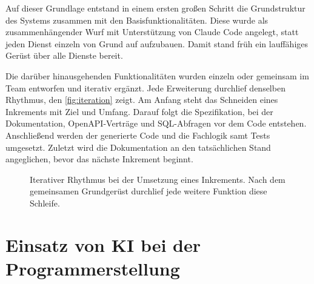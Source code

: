 Auf dieser Grundlage entstand in einem ersten großen Schritt die Grundstruktur des Systems zusammen mit den Basisfunktionalitäten. Diese wurde als zusammenhängender Wurf mit Unterstützung von Claude Code angelegt, statt jeden Dienst einzeln von Grund auf aufzubauen. Damit stand früh ein lauffähiges Gerüst über alle Dienste bereit.

Die darüber hinausgehenden Funktionalitäten wurden einzeln oder gemeinsam im Team entworfen und iterativ ergänzt. Jede Erweiterung durchlief denselben Rhythmus, den \vref{fig:iteration} zeigt. Am Anfang steht das Schneiden eines Inkrements mit Ziel und Umfang. Darauf folgt die Spezifikation, bei der Dokumentation, OpenAPI-Verträge und SQL-Abfragen vor dem Code entstehen. Anschließend werden der generierte Code und die Fachlogik samt Tests umgesetzt. Zuletzt wird die Dokumentation an den tatsächlichen Stand angeglichen, bevor das nächste Inkrement beginnt.

\begin{figure}[ht]
  \centering
  \caption{Iterativer Rhythmus bei der Umsetzung eines Inkrements. Nach dem gemeinsamen Grundgerüst durchlief jede weitere Funktion diese Schleife.}
  \label{fig:iteration}
\end{figure}

\section{Einsatz von KI bei der Programmerstellung}
\label{sec:ki-programmerstellung}

